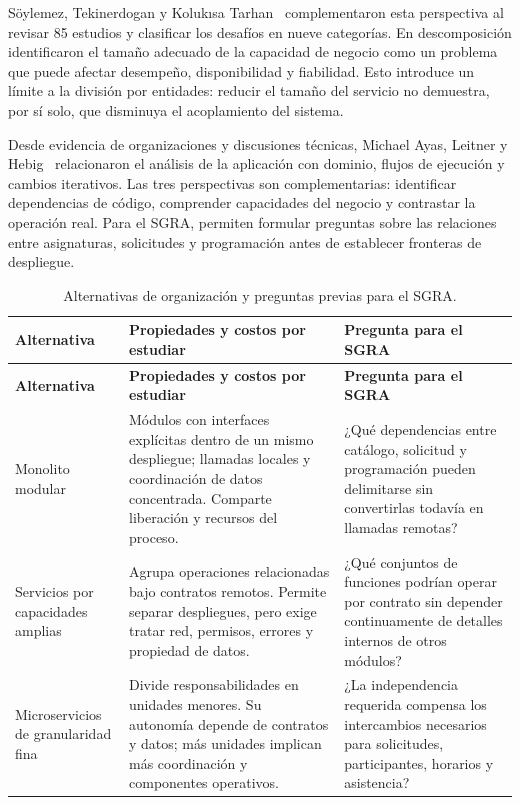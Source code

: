Söylemez, Tekinerdogan y Kolukısa Tarhan~\cite{soylemez2022-challenges} complementaron esta perspectiva al revisar 85 estudios y clasificar los desafíos en nueve categorías. En descomposición identificaron el tamaño adecuado de la capacidad de negocio como un problema que puede afectar desempeño, disponibilidad y fiabilidad. Esto introduce un límite a la división por entidades: reducir el tamaño del servicio no demuestra, por sí solo, que disminuya el acoplamiento del sistema.

Desde evidencia de organizaciones y discusiones técnicas, Michael Ayas, Leitner y Hebig~\cite{ayas2023-migration} relacionaron el análisis de la aplicación con dominio, flujos de ejecución y cambios iterativos. Las tres perspectivas son complementarias: identificar dependencias de código, comprender capacidades del negocio y contrastar la operación real. Para el SGRA, permiten formular preguntas sobre las relaciones entre asignaturas, solicitudes y programación antes de establecer fronteras de despliegue.

\begingroup
\small\setlength{\tabcolsep}{4pt}\renewcommand{\arraystretch}{1.12}
\begin{longtable}{@{}p{}p{}p{}@{}}
\caption{Alternativas de organización y preguntas previas para el SGRA.}\\
\toprule\textbf{Alternativa}&\textbf{Propiedades y costos por estudiar}&\textbf{Pregunta para el SGRA}\\\midrule\endfirsthead
\toprule\textbf{Alternativa}&\textbf{Propiedades y costos por estudiar}&\textbf{Pregunta para el SGRA}\\\midrule\endhead
Monolito modular & Módulos con interfaces explícitas dentro de un mismo despliegue; llamadas locales y coordinación de datos concentrada. Comparte liberación y recursos del proceso. & ¿Qué dependencias entre catálogo, solicitud y programación pueden delimitarse sin convertirlas todavía en llamadas remotas?\\\midrule
Servicios por capacidades amplias & Agrupa operaciones relacionadas bajo contratos remotos. Permite separar despliegues, pero exige tratar red, permisos, errores y propiedad de datos. & ¿Qué conjuntos de funciones podrían operar por contrato sin depender continuamente de detalles internos de otros módulos?\\\midrule
Microservicios de granularidad fina & Divide responsabilidades en unidades menores. Su autonomía depende de contratos y datos; más unidades implican más coordinación y componentes operativos. & ¿La independencia requerida compensa los intercambios necesarios para solicitudes, participantes, horarios y asistencia?\\
\bottomrule
\end{longtable}
\endgroup

